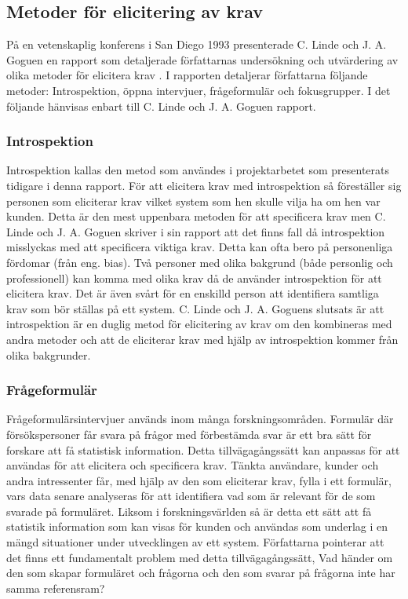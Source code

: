 \subsection{Metoder för elicitering av krav}
På en vetenskaplig konferens i San Diego 1993 presenterade C. Linde och J. A. Goguen en rapport som detaljerade författarnas undersökning och utvärdering av olika metoder för elicitera krav \cite{goguen1993techniques}. I rapporten detaljerar författarna följande metoder: Introspektion, öppna intervjuer, frågeformulär och fokusgrupper. I det följande hänvisas enbart till C. Linde och J. A. Goguen rapport. \cite{goguen1993techniques}

\subsubsection{Introspektion}
Introspektion kallas den metod som användes i projektarbetet som presenterats tidigare i denna rapport. För att elicitera krav med introspektion så föreställer sig personen som eliciterar krav vilket system som hen skulle vilja ha om hen var kunden. Detta är den mest uppenbara metoden för att specificera krav men  C. Linde och J. A. Goguen skriver i sin rapport att det finns fall då introspektion misslyckas med att specificera viktiga krav. Detta kan ofta bero på personenliga fördomar (från eng. bias). Två personer med olika bakgrund (både personlig och professionell) kan komma med olika krav då de använder introspektion för att elicitera krav. Det är även svårt för en enskilld person att identifiera samtliga krav som bör ställas på ett system.  C. Linde och J. A. Goguens slutsats är att introspektion är en duglig metod för elicitering av krav om den kombineras med andra metoder och att de eliciterar krav med hjälp av introspektion kommer från olika bakgrunder. 

\subsubsection{Frågeformulär}
Frågeformulärsintervjuer används inom många forskningsområden. Formulär där försökspersoner får svara på frågor med förbestämda svar är ett bra sätt för forskare att få statistisk information. Detta tillvägagångssätt kan anpassas för att användas för att elicitera och specificera krav. Tänkta användare, kunder och andra intressenter får, med hjälp av den som eliciterar krav, fylla i ett formulär, vars data senare analyseras för att identifiera vad som är relevant för de som svarade på formuläret. Liksom i forskningsvärlden så är detta ett sätt att få statistik information som kan visas för kunden och användas som underlag i en mängd situationer under utvecklingen av ett system. Författarna pointerar att det finns ett fundamentalt problem med detta tillvägagångssätt, Vad händer om den som skapar formuläret och frågorna och den som svarar på frågorna inte har samma referensram?
 
